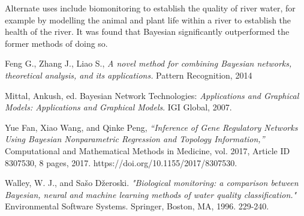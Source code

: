 \documentclass[10pt,a4paper]{article}
\begin{document}
Alternate uses include biomonitoring to establish the quality of river water, for example by modelling the animal and plant life within a river to establish the health of the river. It was found that Bayesian significantly outperformed the former methods of doing so\cite{biomonitoring}.
\begin{thebibliography}{9}
Feng G., Zhang J., Liao S., 
\textit{A novel method for combining Bayesian networks, theoretical
analysis, and its applications.} Pattern Recognition, 2014
 
Mittal, Ankush, ed. Bayesian Network Technologies: \textit{Applications and Graphical Models: Applications and Graphical Models}. IGI Global, 2007.

Yue Fan, Xiao Wang, and Qinke Peng, \textit{“Inference of Gene Regulatory Networks Using Bayesian Nonparametric Regression and Topology Information,”} Computational and Mathematical Methods in Medicine, vol. 2017, Article ID 8307530, 8 pages, 2017. https://doi.org/10.1155/2017/8307530.

Walley, W. J., and Sašo Džeroski. \textit{"Biological monitoring: a comparison between Bayesian, neural and machine learning methods of water quality classification."} Environmental Software Systems. Springer, Boston, MA, 1996. 229-240.
\end{thebibliography}
\end{document}
